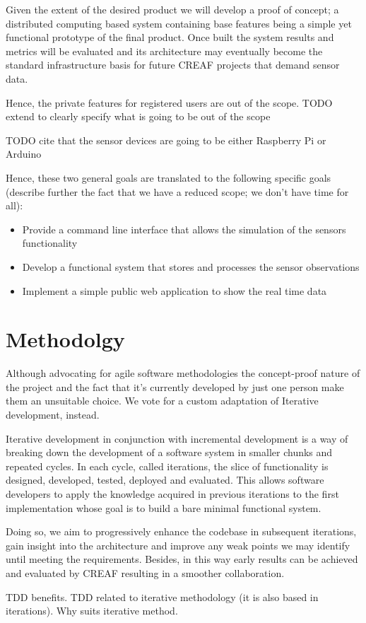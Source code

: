 Given the extent of the desired product we will develop a proof of concept; a distributed computing based system containing base features being a simple yet functional prototype of the final product. Once built the system results and metrics will be evaluated and its architecture may eventually become the standard infrastructure basis for future CREAF projects that demand sensor data.

Hence, the private features for registered users are out of the scope. TODO extend to clearly specify what is going to be out of the scope

TODO cite that the sensor devices are going to be either Raspberry Pi or Arduino

Hence, these two general goals are translated to the following specific goals (describe further the fact that we have a reduced scope; we don't have time for all):

\begin{itemize}
	\item Provide a command line interface that allows the simulation of the sensors functionality
	\item Develop a functional system that stores and processes the sensor observations
	\item Implement a simple public web application to show the real time data
\end{itemize}

\section{Methodolgy}

Although advocating for agile software methodologies the concept-proof nature of the project and the fact that it's currently developed by just one person make them an unsuitable choice. We vote for a custom adaptation of Iterative development, instead.

Iterative development in conjunction with incremental development is a way of breaking down the development of a software system in smaller chunks and repeated cycles. In each cycle, called iterations, the slice of functionality is designed, developed, tested, deployed and evaluated. This allows software developers to apply the knowledge acquired in previous iterations to the first implementation whose goal is to build a bare minimal functional system.

Doing so, we aim to progressively enhance the codebase in subsequent iterations, gain insight into the architecture and improve any weak points we may identify until meeting the requirements. Besides, in this way early results can be achieved and evaluated by CREAF resulting in a smoother collaboration.

TDD benefits. TDD related to iterative methodology (it is also based in iterations). Why suits iterative method.
